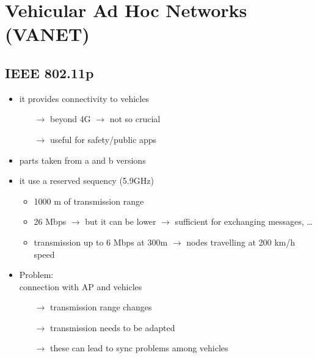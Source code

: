 \section{Vehicular Ad Hoc Networks (VANET)}
\subsection{IEEE 802.11p}
\begin{itemize}
    \item it provides connectivity to vehicles
    \begin{itemize}
        \item[$\rightarrow$] beyond 4G $\rightarrow$ not so crucial
        \item[$\rightarrow$] useful for safety/public apps 
    \end{itemize}
    \item parts taken from a and b versions
    \item it use a reserved sequency (5.9GHz)
    \begin{itemize}
        \item 1000 m of transmission range
        \item 26 Mbps $\rightarrow$ but it can be lower $\rightarrow$ sufficient for
        exchanging messages, \dots
        \item transmission up to 6 Mbps at 300m $\rightarrow$ nodes travelling at
        200 km/h speed
    \end{itemize}
    \item Problem:\\[0.15cm]
    connection with AP and vehicles
    \begin{itemize}
        \item[$\rightarrow$] transmission range changes
        \item[$\rightarrow$] transmission needs to be adapted
        \item[$\rightarrow$] these can lead to sync problems among vehicles
    \end{itemize}
\end{itemize}
